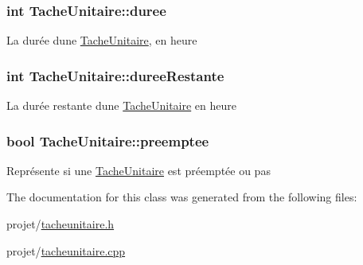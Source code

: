 \subsubsection[{duree}]{\setlength{\rightskip}{0pt plus 5cm}int Tache\+Unitaire\+::duree\hspace{0.3cm}{\ttfamily [private]}}\label{class_tache_unitaire_a5510c1941069a4391e076ec45e0201fc}
La durée d\textquotesingle{}une \hyperlink{class_tache_unitaire}{Tache\+Unitaire}, en heure \hypertarget{class_tache_unitaire_a73dd33a7047739e49c80373aeae3158e}{}
\subsubsection[{duree\+Restante}]{\setlength{\rightskip}{0pt plus 5cm}int Tache\+Unitaire\+::duree\+Restante\hspace{0.3cm}{\ttfamily [private]}}\label{class_tache_unitaire_a73dd33a7047739e49c80373aeae3158e}
La durée restante d\textquotesingle{}une \hyperlink{class_tache_unitaire}{Tache\+Unitaire} en heure \hypertarget{class_tache_unitaire_a21bc1074f99a80976a52d910e3c21041}{}
\subsubsection[{preemptee}]{\setlength{\rightskip}{0pt plus 5cm}bool Tache\+Unitaire\+::preemptee\hspace{0.3cm}{\ttfamily [private]}}\label{class_tache_unitaire_a21bc1074f99a80976a52d910e3c21041}
Représente si une \hyperlink{class_tache_unitaire}{Tache\+Unitaire} est préemptée ou pas 

The documentation for this class was generated from the following files\+:\begin{DoxyCompactItemize}
\item 
projet/\hyperlink{tacheunitaire_8h}{tacheunitaire.\+h}\item 
projet/\hyperlink{tacheunitaire_8cpp}{tacheunitaire.\+cpp}\end{DoxyCompactItemize}
